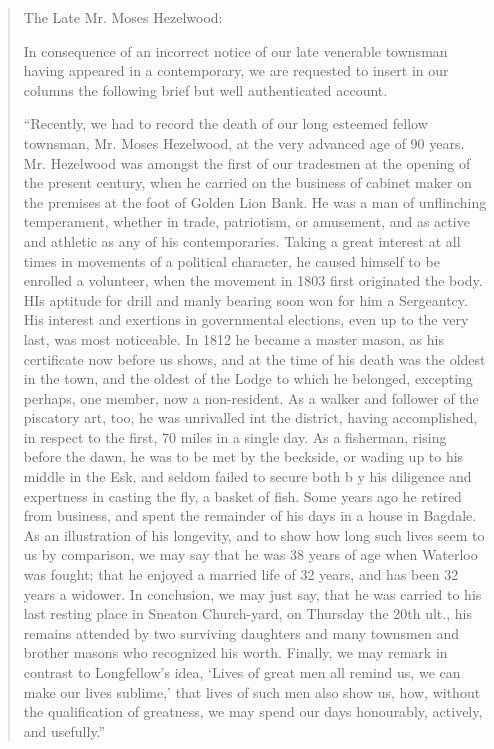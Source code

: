 \begin{quotation}
The Late Mr. Moses Hezelwood:

In consequence of an incorrect notice of our late venerable townsman having appeared in a contemporary, we are requested to insert in our columns the following brief but well authenticated account.

``Recently, we had to record the death of our long esteemed fellow townsman, Mr. Moses Hezelwood, at the very advanced age of 90 years. Mr. Hezelwood was amongst the first of our tradesmen at the opening of the present century, when he carried on the business of cabinet maker on the premises at the foot of Golden Lion Bank. He was a man of unflinching temperament, whether in trade, patriotism, or amusement, and as active and athletic as any of his contemporaries. Taking a great interest at all times in movements of a political character, he caused himself to be enrolled a volunteer, when the movement in 1803 first originated the body. HIs aptitude for drill and manly bearing soon won for him a Sergeantcy. His interest and exertions in governmental elections, even up to the very last, was most noticeable. In 1812 he became a master mason, as his certificate now before us shows, and at the time of his death was the oldest in the town, and the oldest of the Lodge to which he belonged, excepting perhaps, one member, now a non-resident. As a walker and follower of the piscatory art, too, he was unrivalled int the district, having accomplished, in respect to the first, 70 miles in a single day. As a fisherman, rising before the dawn, he was to be met by the beckside, or wading up to his middle in the Esk, and seldom failed to secure both b y his diligence and expertness in casting the fly, a basket of fish. Some years ago he retired from business, and spent the remainder of his days in a house in Bagdale. As an illustration of his longevity, and to show how long such lives seem to us by comparison, we may say that he was 38 years of age when Waterloo was fought; that he enjoyed a married life of 32 years, and has been 32 years a widower. In conclusion, we may just say, that he was carried to his last resting place in Sneaton Church-yard, on Thursday the 20th ult., his remains attended by two surviving daughters and many townsmen and brother masons who recognized his worth. Finally, we may remark in contrast to Longfellow's idea, `Lives of great men all remind us, we can make our lives sublime,' that lives of such men also show us, how, without the qualification of greatness, we may spend our days honourably, actively, and usefully.''
\end{quotation}
